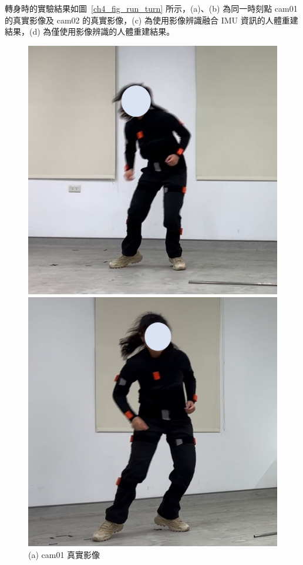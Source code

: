 \clearpage

轉身時的實驗結果如圖~\ref{ch4_fig_run_turn} 所示，(a)、(b) 為同一時刻點 cam01 的真實影像及 cam02 的真實影像，(c) 為使用影像辨識融合 IMU 資訊的人體重建結果，(d) 為僅使用影像辨識的人體重建結果。

\begin{figure}[!ht]
   \centering
   \begin{minipage}{.5\textwidth}
      \centering
      \includegraphics[width=.95\linewidth]{figure/ch4_fig_run_cam01_with2.jpg}
      \caption*{(a) cam01 真實影像}
    \end{minipage}%
    \begin{minipage}{.5\textwidth}
       \centering
       \includegraphics[width=.95\linewidth]{figure/ch4_fig_run_cam02_with2.jpg}

\end{minipage}
\end{figure}
